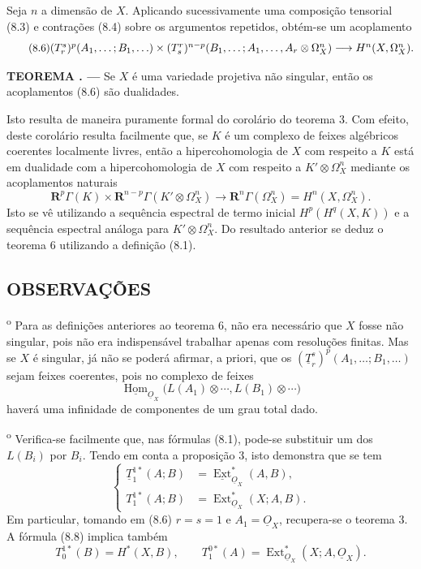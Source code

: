 \documentclass[11pt,twoside,openany]{book}
\numberwithin{equation}{section}
\newcommand{\src}[1]{%
  \phantomsection\hypertarget{src:#1}{}%
  \marginpar{\raggedleft\footnotesize\sffamily #1}%
}
\newcommand{\Osh}{\underline{O}}
\newcommand{\Homsh}{\underline{\operatorname{Hom}}}
\newcommand{\Extsh}{\underline{\operatorname{Ext}}}
\theoremstyle{plain}
\theoremstyle{definition}
\theoremstyle{remark}
\newcommand{\result}[2]{%
  \par\medskip\noindent\textbf{#1%
  \if\relax\detokenize{#2}\relax\else\space#2\fi. ---}\enspace
}
\newcommand{\FgaUnitKey}{frontmatter}
\renewcommand{\src}[1]{%
  \phantomsection\hypertarget{src:\FgaUnitKey:#1}{}%
  \marginpar{\raggedleft\footnotesize\sffamily #1}%
}
\begin{document}
Seja $n$ a dimensão de $X$. Aplicando sucessivamente uma composição
tensorial (8.3) e contrações (8.4) sobre os argumentos repetidos, obtém-se
um acoplamento
\begin{equation}\tag{8.6}
\resizebox{\textwidth}{!}{$
  (T_{r}^{s})^{p}(A_1,\ldots;B_1,\ldots)
  \times
  (T_{s}^{r})^{n-p}(B_1,\ldots;A_1,\ldots,A_r\otimes\Omega_X^{n})
  \longrightarrow H^{n}(X,\Omega_X^{n}).
$}
\end{equation}

\result{TEOREMA}{6} Se $X$ é uma variedade projetiva não singular, então
os acoplamentos (8.6) são dualidades.

Isto resulta de maneira puramente formal do corolário do teorema 3. Com efeito,
deste corolário resulta facilmente que, se $K$ é um complexo de feixes
algébricos coerentes localmente livres, então a hipercohomologia de $X$ com
respeito a $K$ está em dualidade com a hipercohomologia de $X$ com respeito a
$K'\otimes\Omega_X^{n}$ mediante os acoplamentos naturais
\begin{equation}\tag{8.7}
  \mathbf R^{p}\Gamma(K)
  \times\mathbf R^{n-p}\Gamma(K'\otimes\Omega_X^{n})
  \longrightarrow\mathbf R^{n}\Gamma(\Omega_X^{n})
  =H^{n}(X,\Omega_X^{n}).
\end{equation}
Isto se vê utilizando a sequência espectral de termo inicial
$H^{p}(H^{q}(X,K))$ e a sequência espectral análoga para
$K'\otimes\Omega_X^{n}$. Do resultado anterior se deduz o teorema 6
utilizando a definição (8.1).

\src{192}
\subsection*{OBSERVAÇÕES}

\textsuperscript{o} Para as definições anteriores ao teorema 6,
não era necessário que $X$ fosse não singular, pois não era
indispensável trabalhar apenas com resoluções finitas. Mas se $X$
é singular, já não se poderá afirmar, a priori, que os
$(\underline{T}_{r}^{s})^{p}(A_1,\ldots;B_1,\ldots)$ sejam feixes
coerentes, pois no complexo de feixes
\[
  \Homsh_{\Osh_X}\bigl(L(A_1)\otimes\cdots,L(B_1)\otimes\cdots\bigr)
\]
haverá uma infinidade de componentes de um grau total dado.

\medskip
{}\textsuperscript{o} Verifica-se facilmente que, nas fórmulas
(8.1), pode-se substituir um dos $L(B_i)$ por $B_i$. Tendo em conta a
proposição 3, isto demonstra que se tem
\begin{equation}\tag{8.8}
\left\{
\begin{aligned}
  \underline{T}_{1}^{1*}(A;B)&=\Extsh_{\Osh_X}^{*}(A,B),\\
  T_{1}^{1*}(A;B)&=\operatorname{Ext}_{\Osh_X}^{*}(X;A,B).
\end{aligned}
\right.
\end{equation}
Em particular, tomando em (8.6) $r=s=1$ e $A_1=\Osh_X$, recupera-se o
teorema 3. A fórmula (8.8) implica também
\[
  T_{0}^{1*}(B)=H^{*}(X,B),
  \qquad
  T_{1}^{0*}(A)=\operatorname{Ext}_{\Osh_X}^{*}(X;A,\Osh_X).
\]
\end{document}
